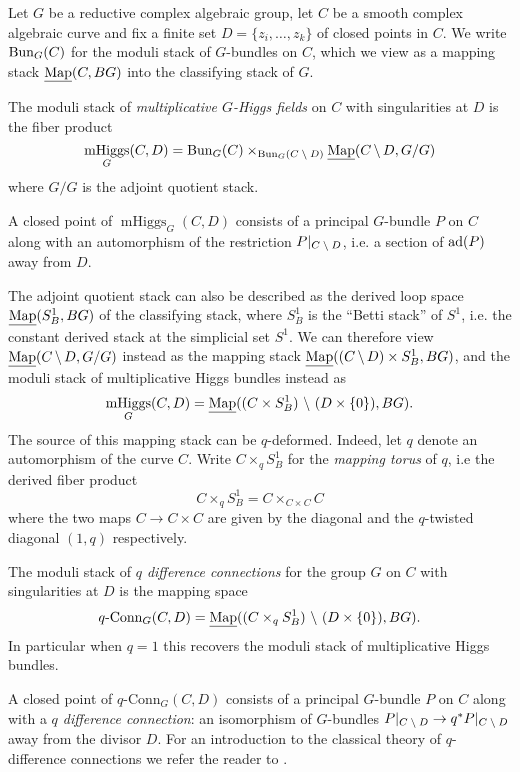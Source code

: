\documentclass[10pt, oneside]{article}
\DeclareMathOperator{\mhiggs}{mHiggs}
\newcommand{\map}{\ul{\mr{Map}}}
\newcommand{\qconn}{q\text{-Conn}}
\renewcommand{\ad}{\mr{ad}}
\begin{document}
Let $G$ be a reductive complex algebraic group, let $C$ be a smooth complex algebraic curve and fix a finite set $D = \{z_i, \ldots, z_k\}$ of closed points in $C$.  We write $\operatorname{Bun}_G(C)$ for the moduli stack of $G$-bundles on $C$, which we view as a mapping stack $\map(C, BG)$ into the classifying stack of $G$.

\begin{definition}
The moduli stack of \emph{multiplicative $G$-Higgs fields} on $C$ with singularities at $D$ is the fiber product
\[\mhiggs_G(C,D) = \bun_G(C) \times_{\bun_G(C \! \bs \! D)} \map(C \! \bs \! D, G/G)\]
where $G/G$ is the adjoint quotient stack.
\end{definition}

\begin{remark}
A closed point of $\mhiggs_G(C,D)$ consists of a principal $G$-bundle $P$ on $C$ along with an automorphism of the restriction $P|_{C \! \ \backslash \  \! D}$, i.e. a section of $\ad(P)$ away from $D$.
\end{remark}

The adjoint quotient stack can also be described as the derived loop space $\map(S^1_B, BG)$ of the classifying stack, where $S^1_B$ is the ``Betti stack'' of $S^1$, i.e. the constant derived stack at the simplicial set $S^1$.  We can therefore view $\map(C \! \bs \! D, G/G)$ instead as the mapping stack $\map((C \! \bs \! D) \times S^1_B, BG)$, and the moduli stack of multiplicative Higgs bundles instead as
\[\mhiggs_G(C,D) = \map((C \times S^1_B) \bs (D \times \{0\}), BG).\]  
The source of this mapping stack can be $q$-deformed.  Indeed, let $q$ denote an automorphism of the curve $C$.  Write $C \times_q S^1_B$ for the \emph{mapping torus} of $q$, i.e the derived fiber product
\[C \times_q S^1_B = C \times_{C \times C} C\]
where the two maps $C \to C \times C$ are given by the diagonal and the $q$-twisted diagonal $(1,q)$ respectively.

\begin{definition}
The moduli stack of \emph{$q$ difference connections} for the group $G$ on $C$ with singularities at $D$ is the mapping space
\[\qconn_G(C,D) = \map((C \times_q S^1_B) \bs (D \times \{0\}), BG).\] 
In particular when $q=1$ this recovers the moduli stack of multiplicative Higgs bundles.
\end{definition}

\begin{remark}
A closed point of $\qconn_G(C,D)$ consists of a principal $G$-bundle $P$ on $C$ along with a \emph{$q$ difference connection}: an isomorphism of $G$-bundles $P|_{C \! \ \backslash \  \! D} \to q^*P|_{C \! \ \backslash \  \! D}$ away from the divisor $D$.  For an introduction to the classical theory of $q$-difference connections we refer the reader to \cite{STSSevostyanov}. 
\end{remark}
\end{document}
